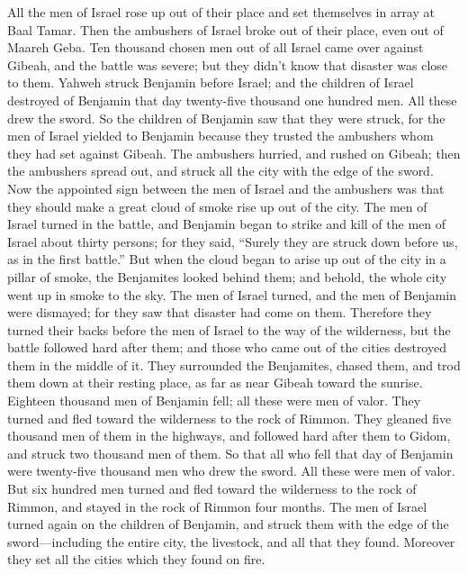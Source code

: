  All the men of Israel rose up out of their place and set
themselves in array at Baal Tamar. Then the ambushers of Israel broke
out of their place, even out of Maareh Geba.  Ten
thousand chosen men out of all Israel came over against Gibeah, and the
battle was severe; but they didn't know that disaster was close to them.
 Yahweh struck Benjamin before Israel; and the children
of Israel destroyed of Benjamin that day twenty-five thousand one
hundred men. All these drew the sword.  So the children
of Benjamin saw that they were struck, for the men of Israel yielded to
Benjamin because they trusted the ambushers whom they had set against
Gibeah.  The ambushers hurried, and rushed on Gibeah;
then the ambushers spread out, and struck all the city with the edge of
the sword.  Now the appointed sign between the men of
Israel and the ambushers was that they should make a great cloud of
smoke rise up out of the city.  The men of Israel turned
in the battle, and Benjamin began to strike and kill of the men of
Israel about thirty persons; for they said, ``Surely they are struck
down before us, as in the first battle.''  But when the
cloud began to arise up out of the city in a pillar of smoke, the
Benjamites looked behind them; and behold, the whole city went up in
smoke to the sky.  The men of Israel turned, and the men
of Benjamin were dismayed; for they saw that disaster had come on them.
 Therefore they turned their backs before the men of
Israel to the way of the wilderness, but the battle followed hard after
them; and those who came out of the cities destroyed them in the middle
of it.  They surrounded the Benjamites, chased them, and
trod them down at their resting place, as far as near Gibeah toward the
sunrise.  Eighteen thousand men of Benjamin fell; all
these were men of valor.  They turned and fled toward the
wilderness to the rock of Rimmon. They gleaned five thousand men of them
in the highways, and followed hard after them to Gidom, and struck two
thousand men of them.  So that all who fell that day of
Benjamin were twenty-five thousand men who drew the sword. All these
were men of valor.  But six hundred men turned and fled
toward the wilderness to the rock of Rimmon, and stayed in the rock of
Rimmon four months.  The men of Israel turned again on
the children of Benjamin, and struck them with the edge of the
sword---including the entire city, the livestock, and all that they
found. Moreover they set all the cities which they found on fire.

